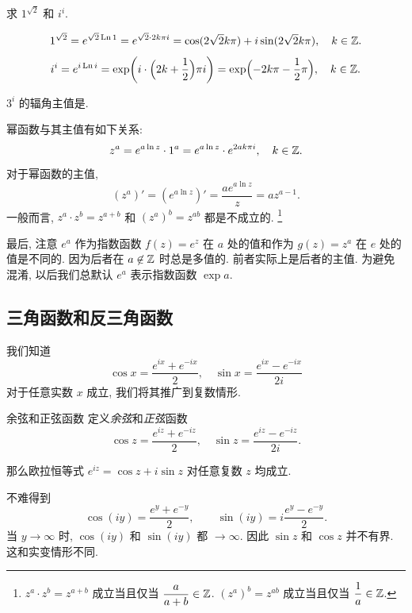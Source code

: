 \begin{example}
	求 $1^{\sqrt 2}$ 和 $i^i$.
\end{example}
\begin{solution}
	\[
    1^{\sqrt2}=e^{\sqrt2\operatorname{Ln}1}
      =e^{\sqrt 2\cdot 2k\pi i}
      =\cos(2\sqrt 2k\pi)+i\sin(2\sqrt 2k\pi), \quad k\in{\mathbb{Z}}.
  \]
	\[
    i^i=e^{i\operatorname{Ln} i}
      =\exp\biggl(i\cdot\Bigl(2k+\frac{1}{2}\Bigr)\pi i\biggr)
			=\exp\Bigl(-2k\pi-\frac{1}{2}\pi\Bigr), \quad k\in{\mathbb{Z}}.
  \]
\end{solution}

\begin{exercise}
	$3^i$ 的辐角主值是\fillblank{}.
\end{exercise}

幂函数与其主值有如下关系:
\[
  z^a=e^{a\ln z}\cdot 1^a
    =e^{a\ln z}\cdot e^{2ak\pi i},\quad k\in{\mathbb{Z}}.
\]
对于幂函数的主值,
\[(z^a)'=\left(e^{a\ln z}\right)'=\frac{ae^{a\ln z}}z=az^{a-1}.\]
一般而言, $z^a\cdot z^b=z^{a+b}$ 和 $(z^a)^b=z^{ab}$ 都是不成立的.
\footnote{$z^a\cdot z^b=z^{a+b}$ 成立当且仅当 $\dfrac{a}{a+b}\in{\mathbb{Z}}$. $(z^a)^b=z^{ab}$ 成立当且仅当 $\dfrac1a\in{\mathbb{Z}}$.}

最后, 注意 $e^a$ 作为指数函数 $f(z)=e^z$ 在 $a$ 处的值和作为 $g(z)=z^a$ 在 $e$ 处的值是\alert{不同}的.
因为后者在 $a\not\in{\mathbb{Z}}$ 时总是多值的.
前者实际上是后者的主值.
为避免混淆, 以后我们总\alert{默认 $e^a$ 表示指数函数 $\exp a$}.


\subsection{三角函数和反三角函数}

我们知道
  \[\cos x=\frac{e^{ix}+e^{-ix}}2,\quad
  \sin x=\frac{e^{ix}-e^{-ix}}{2i}\]
对于任意实数 $x$ 成立,
我们将其推广到复数情形.

\begin{definition}{余弦和正弦函数}
	定义\emph{余弦}和\emph{正弦}函数
	\[\cos z=\frac{e^{iz}+e^{-iz}}2,\quad
	\sin z=\frac{e^{iz}-e^{-iz}}{2i}.\]
\end{definition}
那么欧拉恒等式 \alert{$e^{iz}=\cos z+i\sin z$ 对任意复数 $z$ 均成立}.

不难得到
\[
	\cos(iy)=\dfrac{e^y+e^{-y}}2,\qquad
	{\sin(iy)=i\dfrac{e^y-e^{-y}}2.}
\]
当 $y\to\infty$ 时, $\cos(iy)$ 和 $\sin(iy)$ 都 $\to\infty$.
因此 \alert{$\sin z$ 和 $\cos z$ 并不有界}. 
这和实变情形不同.

